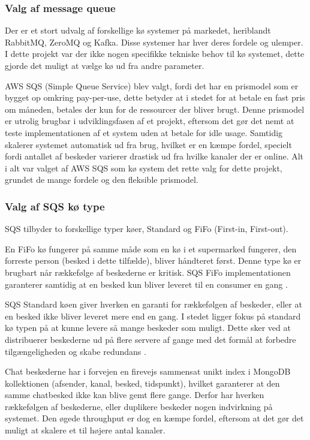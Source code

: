 \documentclass{article}
\begin{document}
\subsubsection{Valg af message queue}
Der er et stort udvalg af forskellige kø systemer på markedet, heriblandt RabbitMQ, ZeroMQ og Kafka. Disse systemer har hver deres fordele og ulemper. I dette projekt var der ikke nogen specifikke tekniske behov til kø systemet, dette gjorde det muligt at vælge kø ud fra andre parameter.

AWS SQS (Simple Queue Service) blev valgt, fordi det har en prismodel som er bygget op omkring pay-per-use, dette betyder at i stedet for at betale en fast pris om måneden, betales der kun for de ressourcer der bliver brugt. Denne prismodel er utrolig brugbar i udviklingsfasen af et projekt, eftersom det gør det nemt at teste implementationen af et system uden at betale for idle usage. Samtidig skalerer systemet automatisk ud fra brug, hvilket er en kæmpe fordel, specielt fordi antallet af beskeder varierer drastisk ud fra hvilke kanaler der er online.
Alt i alt var valget af AWS SQS som kø system det rette valg for dette projekt, grundet de mange fordele og den fleksible prismodel.

\subsubsection{Valg af SQS kø type}
SQS tilbyder to forskellige typer køer, Standard og FiFo (First-in, First-out).

En FiFo kø fungerer på samme måde som en kø i et supermarked fungerer, den forreste person (besked i dette tilfælde), bliver håndteret først. Denne type kø er brugbart når rækkefølge af beskederne er kritisk. SQS FiFo implementationen garanterer samtidig at en besked kun bliver leveret til en consumer en gang \cite{amazon_sqs_queue_types}.

SQS Standard køen giver hverken en garanti for rækkefølgen af beskeder, eller at en besked ikke bliver leveret mere end en gang. I stedet ligger fokus på standard kø typen på at kunne levere så mange beskeder som muligt. Dette sker ved at distribuerer beskederne ud på flere servere af gange med det formål at forbedre tilgængeligheden og skabe redundans \cite{amazon-standard-queue}.

Chat beskederne har i forvejen en firevejs sammensat unikt index i MongoDB kollektionen (afsender, kanal, besked, tidspunkt), hvilket garanterer at den samme chatbesked ikke kan blive gemt flere gange. Derfor har hverken rækkefølgen af beskederne, eller duplikere beskeder nogen indvirkning på systemet. Den øgede throughput er dog en kæmpe fordel, eftersom at det gør det muligt at skalere et til højere antal kanaler.
\end{document}
